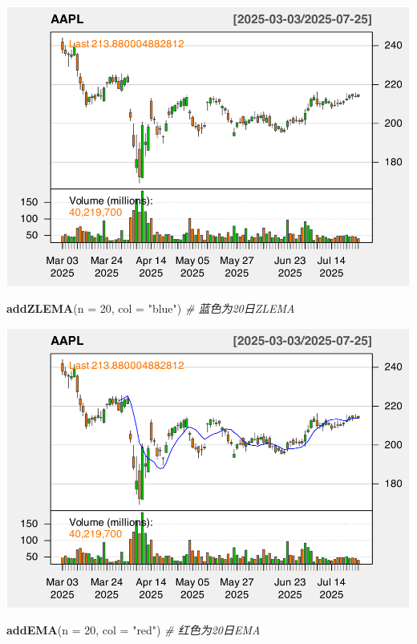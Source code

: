 \documentclass[]{ctexbook}
\newenvironment{Shaded}{\begin{snugshade}}{\end{snugshade}}
\newcommand{\AttributeTok}[1]{\textcolor[rgb]{0.13,0.29,0.53}{#1}}
\newcommand{\CommentTok}[1]{\textcolor[rgb]{0.56,0.35,0.01}{\textit{#1}}}
\newcommand{\DecValTok}[1]{\textcolor[rgb]{0.00,0.00,0.81}{#1}}
\newcommand{\FunctionTok}[1]{\textcolor[rgb]{0.13,0.29,0.53}{\textbf{#1}}}
\newcommand{\NormalTok}[1]{#1}
\newcommand{\StringTok}[1]{\textcolor[rgb]{0.31,0.60,0.02}{#1}}
\begin{document}
\includegraphics[width=0.9\linewidth]{QuantmodHandbook_files/figure-latex/zlema_2-1}

\begin{Shaded}
\begin{Highlighting}[]
\FunctionTok{addZLEMA}\NormalTok{(}\AttributeTok{n =} \DecValTok{20}\NormalTok{, }\AttributeTok{col =} \StringTok{"blue"}\NormalTok{)   }\CommentTok{\# 蓝色为20日ZLEMA}
\end{Highlighting}
\end{Shaded}

\includegraphics[width=0.9\linewidth]{QuantmodHandbook_files/figure-latex/zlema_2-2}

\begin{Shaded}
\begin{Highlighting}[]
\FunctionTok{addEMA}\NormalTok{(}\AttributeTok{n =} \DecValTok{20}\NormalTok{, }\AttributeTok{col =} \StringTok{"red"}\NormalTok{)      }\CommentTok{\# 红色为20日EMA}
\end{Highlighting}
\end{Shaded}
\end{document}
